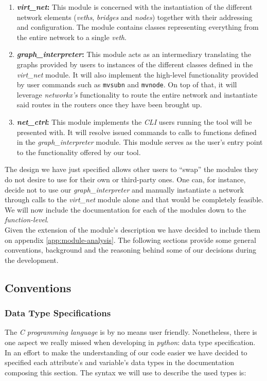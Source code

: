         \begin{enumerate}
            \item \textbf{\textit{virt\_net}:} This module is concerned with the instantiation of the different network elements (\textit{veths}, \textit{bridges} and \textit{nodes}) together with their addressing and configuration. The module contains classes representing everything from the entire network to a single \textit{veth}.
            \item \textbf{\textit{graph\_interpreter}:} This module acts as an intermediary translating the graphs provided by users to instances of the different classes defined in the \textit{virt\_net} module. It will also implement the high-level functionality provided by user commands such as \texttt{mvsubn} and \texttt{mvnode}. On top of that, it will leverage \textit{networkx's} functionality to route the entire network and instantiate said routes in the routers once they have been brought up.
            \item \textbf{\textit{net\_ctrl}:} This module implements the \textit{CLI} users running the tool will be presented with. It will resolve issued commands to calls to functions defined in the \textit{graph\_interpreter} module. This module serves as the user's entry point to the functionality offered by our tool.
        \end{enumerate}

        The design we have just specified allows other users to ``swap'' the modules they do not desire to use for their own or third-party ones. One can, for instance, decide not to use our \textit{graph\_interpreter} and manually instantiate a network through calls to the \textit{virt\_net} module alone and that would be completely feasible. We will now include the documentation for each of the modules down to the \textit{function-level}.\\

        Given the extension of the module's description we have decided to include them on appendix \ref{app:module-analysis}. The following sections provide some general conventions, background and the reasoning behind some of our decisions during the development.\\

        \subsection{Conventions}
            \subsubsection{Data Type Specifications}
                The \textit{C programming language} is by no means user friendly. Nonetheless, there is one aspect we really missed when developing in \textit{python}: data type specification. In an effort to make the understanding of our code easier we have decided to specified each attribute's and variable's data types in the documentation composing this section. The syntax we will use to describe the used types is:\\

